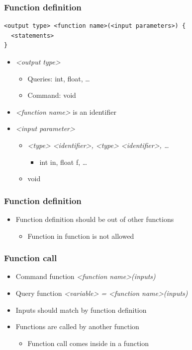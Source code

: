 \documentclass{../c-lecture}
\begin{document}
\begin{frame}[fragile]
  \frametitle{Function \textbf{definition}}
  \begin{verbatim}
<output type> <function name>(<input parameters>) {
  <statements>
}
  \end{verbatim}
  \begin{itemize}
    \item \textit{<output type>}
    \begin{itemize}
      \item \textmd{\color{Orange} Queries}: int, float, \ldots
      \item \textmd{\color{LimeGreen} Command}: void
    \end{itemize}
    \item
      \textit{\color{LimeGreen} <function name>} is an identifier
    \item \textit{\color{Cyan} <input parameter>}
    \begin{itemize}
      \item
        \textit{<type> <identifier>, <type> <identifier>, \ldots}
      \begin{itemize}
        \item int in, float f, \ldots
      \end{itemize}
      \item void
    \end{itemize}
  \end{itemize}
\end{frame}

\begin{frame}
  \frametitle{Function \textbf{definition}}
  \begin{itemize}
    \item Function definition should be out of other functions
    \begin{itemize}
      \item Function in function is not allowed
    \end{itemize}
  \end{itemize}
\end{frame}

\begin{frame}
  \frametitle{Function call}
  \begin{itemize}
    \item Command function
    \textit{\color{LimeGreen} <function name>(inputs)}
    \item Query function
    \textit{\color{LimeGreen} <variable> = <function name>(inputs)}
    \item Inputs should match by function definition
    \item Functions are called by another function
    \begin{itemize}
      \item Function call comes inside in a function
    \end{itemize}
  \end{itemize}
\end{frame}
\end{document}
